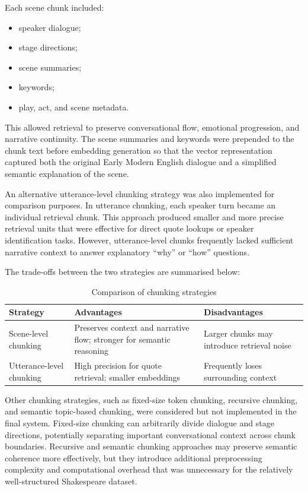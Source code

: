 \documentclass[10pt,conference]{IEEEtran}
\begin{document}
Each scene chunk included:
\begin{itemize}
	\item speaker dialogue;
	\item stage directions;
	\item scene summaries;
	\item keywords;
	\item play, act, and scene metadata.
\end{itemize}

This allowed retrieval to preserve conversational flow, emotional progression, and narrative continuity. The scene summaries and keywords were prepended to the chunk text before embedding generation so that the vector representation captured both the original Early Modern English dialogue and a simplified semantic explanation of the scene.

An alternative utterance-level chunking strategy was also implemented for comparison purposes. In utterance chunking, each speaker turn became an individual retrieval chunk. This approach produced smaller and more precise retrieval units that were effective for direct quote lookups or speaker identification tasks. However, utterance-level chunks frequently lacked sufficient narrative context to answer explanatory ``why'' or ``how'' questions.

The trade-offs between the two strategies are summarised below:

\begin{table}[h]
	\centering
    \caption{Comparison of chunking strategies}
    \label{tab:chunking}
	\small
	\begin{tabularx}{\linewidth}{|p{2cm}|X|X|}
		\hline
		\textbf{Strategy} & \textbf{Advantages} & \textbf{Disadvantages} \\
		\hline
		Scene-level chunking &
		Preserves context and narrative flow; stronger for semantic reasoning &
		Larger chunks may introduce retrieval noise \\
		\hline
		Utterance-level chunking &
		High precision for quote retrieval; smaller embeddings &
		Frequently loses surrounding context \\
		\hline
	\end{tabularx}
\end{table}
Other chunking strategies, such as fixed-size token chunking, recursive chunking, and semantic topic-based chunking, were considered but not implemented in the final system. Fixed-size chunking can arbitrarily divide dialogue and stage directions, potentially separating important conversational context across chunk boundaries. Recursive and semantic chunking approaches may preserve semantic coherence more effectively, but they introduce additional preprocessing complexity and computational overhead that was unnecessary for the relatively well-structured Shakespeare dataset.
\end{document}
